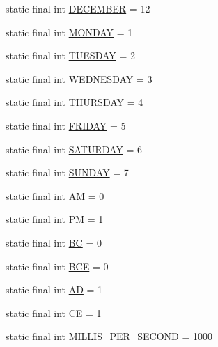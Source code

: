 \begin{DoxyCompactItemize}
\item 
static final int \hyperlink{classorg_1_1joda_1_1time_1_1_date_time_constants_a85300551d2446d6484e425396b8c8fb4}{D\-E\-C\-E\-M\-B\-E\-R} = 12
\item 
static final int \hyperlink{classorg_1_1joda_1_1time_1_1_date_time_constants_a016345942d565c4e924d7cb5666659e0}{M\-O\-N\-D\-A\-Y} = 1
\item 
static final int \hyperlink{classorg_1_1joda_1_1time_1_1_date_time_constants_a7106d0fa721cea97a63572d33705f8e7}{T\-U\-E\-S\-D\-A\-Y} = 2
\item 
static final int \hyperlink{classorg_1_1joda_1_1time_1_1_date_time_constants_ad41ca1fec0fa86e26f1d36985b482da0}{W\-E\-D\-N\-E\-S\-D\-A\-Y} = 3
\item 
static final int \hyperlink{classorg_1_1joda_1_1time_1_1_date_time_constants_a01b49424a9c6b92a992f400557ba62be}{T\-H\-U\-R\-S\-D\-A\-Y} = 4
\item 
static final int \hyperlink{classorg_1_1joda_1_1time_1_1_date_time_constants_afb0fb4517687916aea12ea47d84b547c}{F\-R\-I\-D\-A\-Y} = 5
\item 
static final int \hyperlink{classorg_1_1joda_1_1time_1_1_date_time_constants_a1a5c72374e3b4c88caeb251305bdd35a}{S\-A\-T\-U\-R\-D\-A\-Y} = 6
\item 
static final int \hyperlink{classorg_1_1joda_1_1time_1_1_date_time_constants_a57ac0e5b9df975553c2bc85cfb119144}{S\-U\-N\-D\-A\-Y} = 7
\item 
static final int \hyperlink{classorg_1_1joda_1_1time_1_1_date_time_constants_a33b963aeeda8e7ba9b60eb239bbf4146}{A\-M} = 0
\item 
static final int \hyperlink{classorg_1_1joda_1_1time_1_1_date_time_constants_a2f88be2afd48b2a8be3e3e0d23a9c464}{P\-M} = 1
\item 
static final int \hyperlink{classorg_1_1joda_1_1time_1_1_date_time_constants_ac3470e8c39548891cf8933bb9acfc9d1}{B\-C} = 0
\item 
static final int \hyperlink{classorg_1_1joda_1_1time_1_1_date_time_constants_a224de2adaa34c7641411c402b004f131}{B\-C\-E} = 0
\item 
static final int \hyperlink{classorg_1_1joda_1_1time_1_1_date_time_constants_a228b98aa67b9a507f187015edf31d7bf}{A\-D} = 1
\item 
static final int \hyperlink{classorg_1_1joda_1_1time_1_1_date_time_constants_aacd9ad6e2964b143878d155f86db83bd}{C\-E} = 1
\item 
static final int \hyperlink{classorg_1_1joda_1_1time_1_1_date_time_constants_a909d69e8c8be33d19a569a9912679fe1}{M\-I\-L\-L\-I\-S\-\_\-\-P\-E\-R\-\_\-\-S\-E\-C\-O\-N\-D} = 1000

\end{DoxyCompactItemize}
